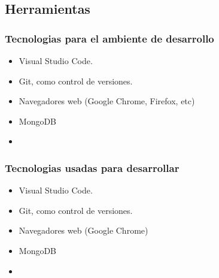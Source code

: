 \subsection{Herramientas}

\subsubsection*{Tecnologias para el ambiente de desarrollo}
\begin{itemize}
    \item Visual Studio Code.
    \item Git, como control de versiones.
    \item Navegadores web (Google Chrome, Firefox, etc)
    \item MongoDB
    \item 
\end{itemize}

\subsubsection*{Tecnologias usadas para desarrollar}
\begin{itemize}
    \item Visual Studio Code.
    \item Git, como control de versiones.
    \item Navegadores web (Google Chrome)
    \item MongoDB
    \item 
\end{itemize}


